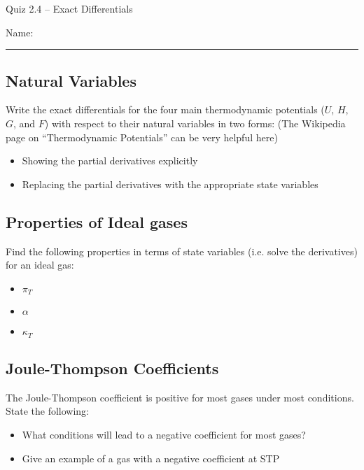 \documentclass[11pt, letterpaper]{memoir}
\begin{document}
	\begin{center}
		{\large Quiz 2.4 -- Exact Differentials}
	\end{center}
	{\large Name: \rule[-1mm]{4in}{.1pt} 

\subsection*{Natural Variables}
Write the exact differentials for the four main thermodynamic potentials ($U$, $H$, $G$, and $F$) with respect to their natural variables in two forms: (The Wikipedia page on “Thermodynamic Potentials” can be very helpful here)
\begin{itemize}
	\item Showing the partial derivatives explicitly
	
	\vspace{3em}
	\item Replacing the partial derivatives with the appropriate state variables
\end{itemize}

\vspace{3em}
\subsection*{Properties of Ideal gases}
Find the following properties in terms of state variables (i.e. solve the derivatives) for an ideal gas:
\begin{itemize}
	\item $\pi_T$
	
	\vspace{3em}
	\item $\alpha$
	
	\vspace{3em}
	\item $\kappa_T$
\end{itemize}

\vspace{3em}
\subsection*{Joule-Thompson Coefficients}
The Joule-Thompson coefficient is positive for most gases under most conditions. State the following:
\begin{itemize}
	\item What conditions will lead to a negative coefficient for most gases?
	
	\vspace{3em}
	\item Give an example of a gas with a negative coefficient at STP
\end{itemize}
\newpage
\pagestyle{empty}
\addtocounter{page}{-1}
}
\end{document}
